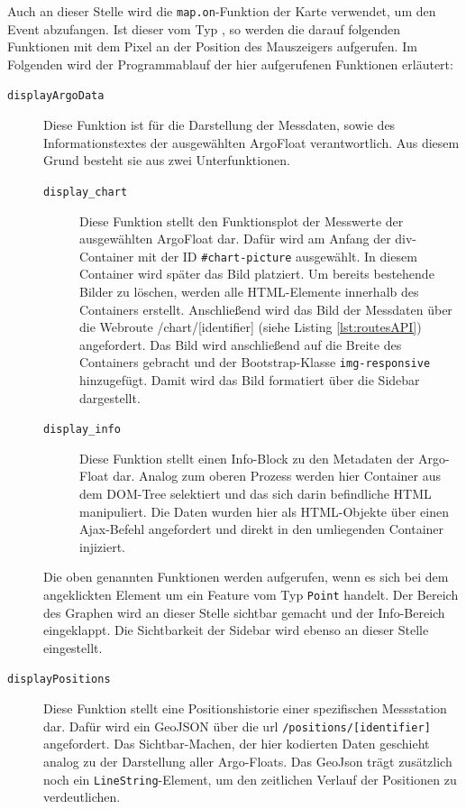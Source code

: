 Auch an dieser Stelle wird die \texttt{map.on}-Funktion der Karte verwendet, um den Event abzufangen. Ist dieser vom Typ , so werden die darauf folgenden Funktionen mit dem Pixel an der Position des Mauszeigers aufgerufen. Im Folgenden wird der Programmablauf der hier aufgerufenen Funktionen erläutert:

\begin{description}
 \item [\texttt{displayArgoData}]
    Diese Funktion ist für die Darstellung der Messdaten, sowie des Informationstextes der ausgewählten ArgoFloat verantwortlich. Aus diesem Grund besteht sie aus zwei Unterfunktionen.
    \begin{description}
    \item [\texttt{display\_chart}]
        Diese Funktion stellt den Funktionsplot der Messwerte der ausgewählten ArgoFloat dar. Dafür wird am Anfang der div-Container mit der ID \texttt{\#chart-picture} ausgewählt. In diesem Container wird später das Bild platziert. Um bereits bestehende Bilder zu löschen, werden alle HTML-Elemente innerhalb des Containers erstellt. Anschließend wird das Bild der Messdaten über die Webroute /chart/[identifier]  (siehe Listing \ref{lst:routesAPI}) angefordert. Das Bild wird anschließend auf die Breite des Containers gebracht und der Bootstrap-Klasse \texttt{img-responsive} hinzugefügt. Damit wird das Bild formatiert über die Sidebar dargestellt.
    \pagebreak
    \item [\texttt{display\_info}]
        Diese Funktion stellt einen Info-Block zu den Metadaten der Argo-Float dar. Analog zum oberen Prozess werden hier Container aus dem DOM-Tree selektiert und das sich darin befindliche  \gls{HTML} manipuliert. Die Daten wurden hier als HTML-Objekte über einen Ajax-Befehl angefordert und direkt in den umliegenden Container injiziert.
    \end{description}

    Die oben genannten Funktionen werden aufgerufen, wenn es sich bei dem angeklickten Element um ein Feature vom Typ \texttt{Point} handelt. Der Bereich des Graphen wird an dieser Stelle sichtbar gemacht und der Info-Bereich eingeklappt. Die Sichtbarkeit der Sidebar wird ebenso an dieser Stelle eingestellt.

 \item [\texttt{displayPositions}]
    Diese Funktion stellt eine Positionshistorie einer spezifischen Messstation dar. Dafür wird ein GeoJSON über die url \texttt{/positions/[identifier]} angefordert. Das Sichtbar-Machen, der hier kodierten Daten geschieht analog zu der Darstellung aller Argo-Floats. Das GeoJson trägt zusätzlich noch ein \texttt{LineString}-Element, um den zeitlichen Verlauf der Positionen zu verdeutlichen.
\end{description}





